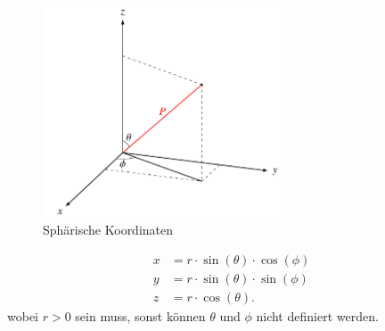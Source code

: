 \begin{figure}[h]
	\centering
	\includegraphics[width=200pt]{papers/spektral/images/spherical_coordinates.pdf}
	\caption{Sphärische Koordinaten}
    \label{spektral:fig:sphericalcoords}
\end{figure}
\pagebreak

\begin{align}
x &= r\cdot\sin(\theta)\cdot\cos(\phi)
\label{spektral:equation4}
\\
 y &= r\cdot\sin(\theta)\cdot\sin(\phi)
\label{spektral:equation5}
\\
 z &= r\cdot\cos(\theta).
\label{spektral:equation6}
\end{align}
wobei $r > 0$ sein muss, sonst können $\theta$ und $\phi$ nicht definiert werden.


